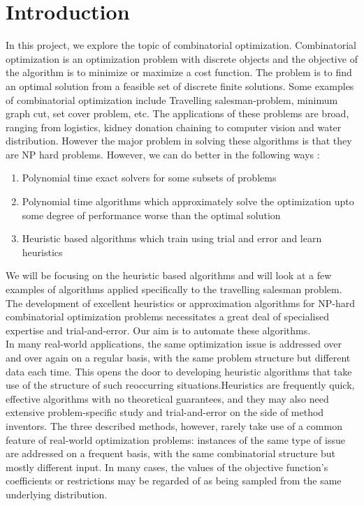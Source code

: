 \documentclass{article}
\theoremstyle{definition}
\begin{document}
\clearpage
\pagestyle{fancy}
\tableofcontents
\clearpage
\section{Introduction}
In this project, we explore the topic of combinatorial optimization. Combinatorial optimization is an optimization problem with discrete objects and the objective of the algorithm is to minimize or maximize a cost function. The problem is to find an optimal solution from a feasible set of discrete finite solutions. Some examples of combinatorial optimization include Travelling salesman-problem, minimum graph cut, set cover problem, etc. The applications of these problems are broad, ranging from logistics, kidney donation chaining to computer vision and water distribution. However the major problem in solving these algorithms is that they are NP hard problems. However, we can do better in the following ways :
\begin{enumerate}
    \item Polynomial time exact solvers for some subsets of problems
    \item Polynomial time algorithms which approximately solve the optimization upto some degree of performance worse than the optimal solution
    \item Heuristic based algorithms which train using trial and error and learn heuristics
    
\end{enumerate}
We will be focusing on the heuristic based algorithms and will look at a few examples of algorithms applied specifically to the travelling salesman problem. The development of excellent heuristics or approximation algorithms for NP-hard combinatorial optimization problems necessitates a great deal of specialised expertise and trial-and-error. Our aim is to automate these algorithms. \\

In many real-world applications, the same optimization issue is addressed over and over again on a regular basis, with the same problem structure but different data each time. This opens the door to developing heuristic algorithms that take use of the structure of such reoccurring situations.Heuristics are frequently quick, effective algorithms with no theoretical guarantees, and they may also need extensive problem-specific study and trial-and-error on the side of method inventors. The three described methods, however, rarely take use of a common feature of real-world optimization problems: instances of the same type of issue are addressed on a frequent basis, with the same combinatorial structure but mostly different input. In many cases, the values of the objective function's coefficients or restrictions may be regarded of as being sampled from the same underlying distribution.\\
\end{document}
